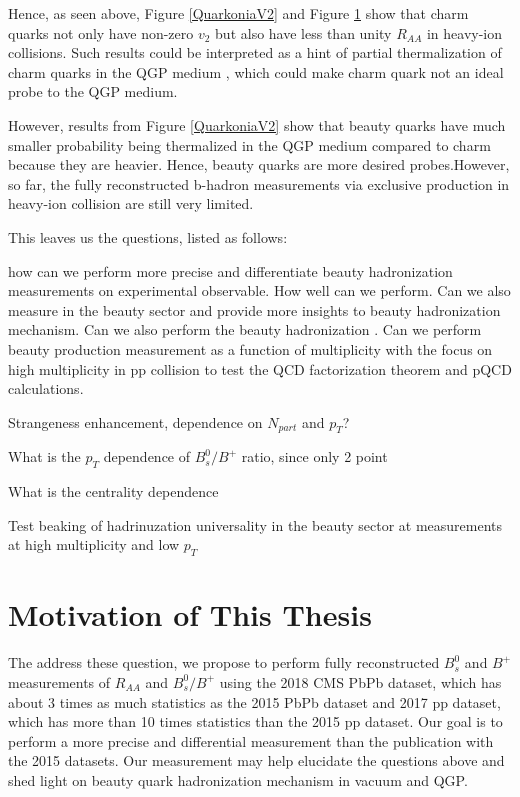 
Hence, as seen above, Figure \ref{QuarkoniaV2} and Figure \ref{} show that charm quarks not only have non-zero $v_2$ but also have less than unity $R_{AA}$ in heavy-ion collisions. Such results could be interpreted as a hint of partial thermalization of charm quarks in the QGP medium \cite{CharmThermal}, which could make charm quark not an ideal probe to the QGP medium. 

However, results from Figure \ref{QuarkoniaV2} show that beauty quarks have much smaller probability being thermalized in the QGP medium compared to charm because they are heavier. Hence, beauty quarks are more desired probes.However, so far, the fully reconstructed b-hadron measurements via exclusive production in heavy-ion collision are still very limited. 

This leaves us the questions, listed as follows:



how can we perform more precise and differentiate beauty hadronization measurements on experimental observable. How well can we perform. Can we also measure in the beauty sector and provide more insights to beauty hadronization mechanism. Can we also perform the beauty hadronization . Can we perform beauty production measurement as a function of multiplicity with the focus on high multiplicity  in pp collision to test the QCD factorization theorem and pQCD calculations. 


Strangeness enhancement, dependence on $N_{part}$ and $p_T$?

What is the $p_T$ dependence of $B^0_s/B^+$ ratio, since only 2 point

What is the centrality dependence

Test beaking of hadrinuzation universality in the beauty sector at measurements at high multiplicity and low $p_T$


\section{Motivation of This Thesis}

The address these question, we propose to perform fully reconstructed $B^0_s$ and $B^+$ measurements of $R_{AA}$ and $B^0_s/B^+$ using the 2018 CMS PbPb dataset, which has about 3 times as much statistics as the 2015 PbPb dataset and 2017 pp dataset, which has more than 10 times statistics than the 2015 pp dataset. Our goal is to perform a more precise and differential measurement than the publication with the 2015 datasets. Our measurement may help elucidate the questions above and shed light on beauty quark hadronization mechanism in vacuum and QGP. 


